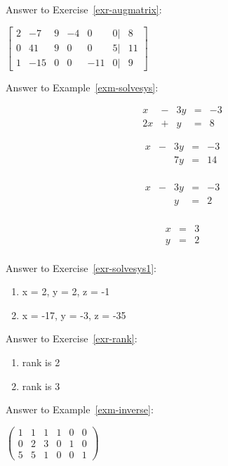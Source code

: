 \documentclass[
  letterpaper,
]{book}
\theoremstyle{definition}
\theoremstyle{definition}
\theoremstyle{plain}
\theoremstyle{definition}
\theoremstyle{plain}
\theoremstyle{plain}
\theoremstyle{remark}
\begin{document}
Answer to Exercise~\ref{exr-augmatrix}:

\(\begin{bmatrix}  2 & -7 & 9 & -4 & 0 & 0| & 8\\  0 & 41 & 9 & 0 & 0 & 5 | & 11\\  1 & -15 & 0 & 0 & -11 & 0 | & 9  \end{bmatrix}\)

Answer to Example~\ref{exm-solvesys}:

\[\begin{matrix}
    x  & - & 3y & = & -3\\
    2x & + &  y & = &  8
    \end{matrix}\]

\[\begin{matrix}
    x  & - & 3y & = & -3\\
       &   & 7y & = & 14\\          
    \end{matrix}\]

\[\begin{matrix}
    x  & - & 3y & = & -3\\
       &   & y & = & 2\\            
    \end{matrix}\]

\[\begin{matrix}
    x & = & 3\\
    y & = & 2\\         
    \end{matrix}\]

Answer to Exercise~\ref{exr-solvesys1}:

\begin{enumerate}
\def\labelenumi{\arabic{enumi}.}
\item
  x = 2, y = 2, z = -1
\item
  x = -17, y = -3, z = -35
\end{enumerate}

Answer to Exercise~\ref{exr-rank}:

\begin{enumerate}
\def\labelenumi{\arabic{enumi}.}
\item
  rank is 2
\item
  rank is 3
\end{enumerate}

Answer to Example~\ref{exm-inverse}:

\(\left(\begin{array}{ccc|ccc}  1&1&1&1&0&0\\  0&2&3&0&1&0\\  5&5&1&0&0&1 \end{array} \right)\)
\end{document}
